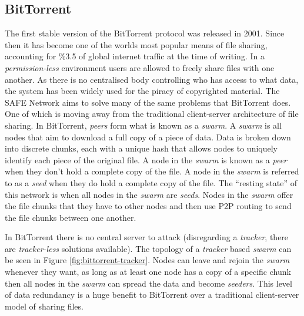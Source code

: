 \subsection{BitTorrent}

The first stable version of the BitTorrent\cite{cohen2008bittorrent} protocol was released in 2001. Since then it has become one of the worlds most popular means of file sharing, accounting for \%3.5 of global internet traffic at the time of writing\cite{bittorrent-usage}. In a \textit{permission-less} environment users are allowed to freely share files with one another. As there is no centralised body controlling who has access to what data, the system has been widely used for the piracy of copyrighted material. The SAFE Network aims to solve many of the same problems that BitTorrent does. One of which is moving away from the traditional client-server architecture of file sharing. In BitTorrent, \textit{peers} form what is known as a \textit{swarm}. A \textit{swarm} is all nodes that aim to download a full copy of a piece of data. Data is broken down into discrete chunks, each with a unique hash that allows nodes to uniquely identify each piece of the original file. A node in the \textit{swarm} is known as a \textit{peer} when they don't hold a complete copy of the file. A node in the \textit{swarm} is referred to as a \textit{seed} when they do hold a complete copy of the file. The ``resting state'' of this network is when all nodes in the \textit{swarm} are \textit{seeds}. Nodes in the \textit{swarm} offer the file chunks that they have to other nodes and then use P2P routing to send the file chunks between one another.

In BitTorrent there is no central server to attack (disregarding a \textit{tracker}, there are \textit{tracker-less} solutions available). The topology of a \textit{tracker} based \textit{swarm} can be seen in Figure \ref{fig:bittorrent-tracker}. Nodes can leave and rejoin the \textit{swarm} whenever they want, as long as at least one node has a copy of a specific chunk then all nodes in the \textit{swarm} can spread the data and become \textit{seeders}. This level of data redundancy is a huge benefit to BitTorrent over a traditional client-server model of sharing files.

